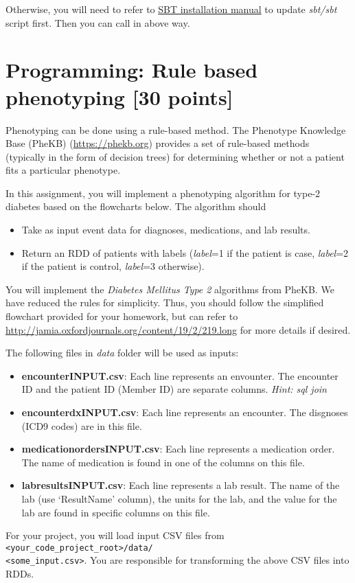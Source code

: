 \documentclass[12pt]{article}
\begin{document}
Otherwise, you will need to refer to \href{http://www.scala-sbt.org/0.13/docs/Manual-Installation.html}{SBT installation manual} to update \textit{sbt/sbt} script first. Then you can call in above way.

\section{Programming: Rule based phenotyping [30 points]}
Phenotyping can be done using a rule-based method. The Phenotype Knowledge Base (PheKB) (\url{https://phekb.org}) provides a set of rule-based methods (typically in the form of decision trees) for determining whether or not a patient fits a particular phenotype.

In this assignment, you will implement a phenotyping algorithm for type-2 diabetes based on the flowcharts below. The algorithm should
\begin{itemize}
\item Take as input event data for diagnoses, medications, and lab results.
\item Return an RDD of patients with labels (\textit{label}=1 if the patient is case, \textit{label}=2 if the patient is control, \textit{label}=3 otherwise). 
\end{itemize}
You will implement the \textit{Diabetes Mellitus Type 2} algorithms from PheKB. We have reduced the rules for simplicity. Thus, you should follow the simplified flowchart provided for your homework, but can refer to \url{http://jamia.oxfordjournals.org/content/19/2/219.long} for more details if desired.

The following files in \textit{data} folder will be used as inputs:
\begin{itemize}
\item \textbf{encounter\textunderscore INPUT.csv}: Each line represents an envounter. The encounter ID and the patient ID (Member ID) are separate columns. \textit{Hint: sql join}
\item \textbf{encounter\textunderscore dx\textunderscore INPUT.csv}: Each line represents an encounter. The disgnoses (ICD9 codes) are in this file.
\item \textbf{medication\textunderscore orders\textunderscore INPUT.csv}: Each line represents a medication order. The name of medication is found in one of the columns on this file.
\item \textbf{lab\textunderscore results\textunderscore INPUT.csv}: Each line represents a lab result. The name of the lab (use `Result\textunderscore Name'  column), the units for the lab, and the value for the lab are found in specific columns on this file.
\end{itemize}
For your project, you will load input CSV files from \texttt{<your\_code\_project\_root>/data/\\<some\_input.csv>}. You are responsible for transforming the above CSV files into RDDs.
\end{document}
